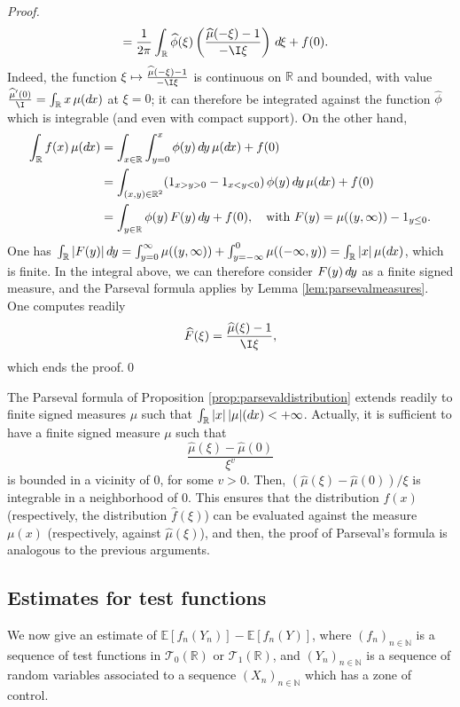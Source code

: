 \documentclass[envcountsame]{svmult}
\newcommand{\N}{\mathbb{N}}
\newcommand{\R}{\mathbb{R}}
\newcommand{\esper}{\mathbb{E}}
\newcommand{\testf}{\mathscr{T}}
\newcommand{\DD}[1]{\,d\hspace*{-0.3mm}{#1}}
\begin{document}
\begin{proof}
\begin{align*}
&=\frac{1}{2\pi}\int_{\R} \widehat{\phi}(\xi)\left(\frac{\widehat{\mu}(-\xi)-1}{-\I\xi}\right)\DD{\xi} + f(0). 
\end{align*}
Indeed, the function $\xi \mapsto \frac{\widehat{\mu}(-\xi)-1}{-\I\xi}$ is continuous on $\R$ and bounded, with value $\frac{\widehat{\mu}'(0)}{\I} = \int_{\R} x\,\mu(\!\DD{x})$ at $\xi=0$; it can therefore be integrated against the function $\widehat{\phi}$ which is integrable (and even with compact support). On the other hand,
\begin{align*}
\int_{\R}f(x)\,\mu(\!\DD{x}) &= \int_{x \in \R} \int_{y=0}^x \phi(y)\DD{y}\,\mu(\!\DD{x})+f(0) \\
&=\int_{(x,y) \in \R^2} (1_{x>y>0} - 1_{x<y<0})\, \phi(y)\DD{y}\,\mu(\!\DD{x})+f(0) \\
&= \int_{y \in \R} \phi(y)\,F(y)\DD{y}+f(0),\quad\text{with }F(y) = \mu((y,\infty)) - 1_{y\leq 0}.
\end{align*}
One has $\int_{\R}|F(y)|\DD{y} = \int_{y=0}^\infty\mu((y,\infty)) + \int_{y=-\infty}^0 \mu((-\infty,y)) = \int_{\R} |x|\,\mu(\!\DD{x})$, which is finite. In the integral above, we can therefore consider $F(y)\DD{y}$ as a finite signed measure, and the Parseval formula applies by Lemma \ref{lem:parsevalmeasures}. One computes readily
$$\widehat{F}(\xi) = \frac{\widehat{\mu}(\xi)-1}{\I\xi},$$
which ends the proof.\qed
\end{proof}

\begin{remark}
  \label{rmk:parsevaldistribution}
The Parseval formula of Proposition \ref{prop:parsevaldistribution} extends readily to finite signed measures $\mu$ such that $\int_{\R}|x|\,|\mu|(\!\DD{x})<+\infty$. Actually, it is sufficient to have a finite signed measure $\mu$ such that
$$\frac{\widehat{\mu}(\xi)-\widehat{\mu}(0)}{\xi^v}$$
is bounded in a vicinity of $0$, for some $v>0$. Then, $(\widehat{\mu}(\xi)-\widehat{\mu}(0))/\xi$ is integrable in a neighborhood of $0$. This ensures that the distribution $f(x)$ (respectively, the distribution $\widehat{f}(\xi)$) can be evaluated against the measure $\mu(x)$ (respectively, against $\widehat{\mu}(\xi)$), and then, the proof of Parseval's formula is analogous to the previous arguments.
\end{remark}



\subsection{Estimates for test functions}
We now give an estimate of $\esper[f_n(Y_n)]-\esper[f_n(Y)]$, where $(f_n)_{n \in \N}$ is a sequence of test functions in $\testf_0(\R)$ or $\testf_1(\R)$, and $(Y_n)_{n\in\N}$ is a sequence of random variables associated to a sequence $(X_n)_{n\in \N}$ which has a zone of control.
\end{document}
